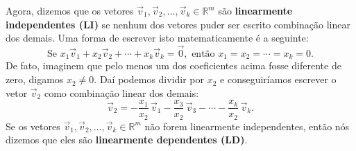 \documentclass[../livro.tex]{subfiles}
\begin{document}
Agora, dizemos que os vetores $\vec{v}_1, \vec{v}_2, \dots, \vec{v}_k  \in \mathbb{R}^m$ são \textbf{linearmente independentes (LI)} se nenhum dos vetores puder ser escrito combinação linear dos demais. Uma forma de escrever isto matematicamente é a seguinte:
\begin{equation}
\boxed{\text{Se } x_1 \vec{v}_1 + x_2 \vec{v}_2 + \cdots + x_k \vec{v}_k = \vec{0}, \text{ então } x_1 = x_2 = \cdots = x_k = 0.}
\end{equation} De fato, imaginem que pelo menos um dos coeficientes acima fosse diferente de zero, digamos $x_2 \neq 0$. Daí podemos dividir por $x_2$ e conseguiríamos escrever o vetor $\vec{v}_2$ como combinação linear dos demais:
\begin{equation}
\vec{v}_2 = - \frac{x_1}{x_2} \, \vec{v}_1 - \frac{x_3}{x_2} \, \vec{v}_3 - \cdots - \frac{x_k}{x_2} \, \vec{v}_k.
\end{equation} Se os vetores $\vec{v}_1, \vec{v}_2, \dots, \vec{v}_k  \in \mathbb{R}^m$ não forem linearmente independentes, então nós dizemos que eles são \textbf{linearmente dependentes (LD)}.
\end{document}
